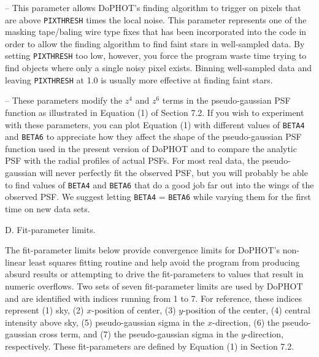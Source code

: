  -- This parameter allows DoPHOT's
finding algorithm to trigger on pixels that are above
{\tt PIXTHRESH} times the local noise.  This parameter
represents one of the masking tape/baling wire type fixes
that has been incorporated into the code in order to 
allow the finding algorithm to find faint stars in 
well-sampled data.  By setting {\tt PIXTHRESH} too low,
however, you force the program waste time trying to
find objects where only a single noisy pixel exists.  
Binning well-sampled data and leaving {\tt PIXTHRESH}
at 1.0 is usually more effective at finding faint stars.

 -- These parameters modify the
$z^4$ and $z^6$ terms in the pseudo-gaussian PSF function
as illustrated in Equation (1) of Section 7.2.  If you wish
to experiment with these parameters, you can  
plot Equation (1) with different values of
{\tt BETA4} and {\tt BETA6} to appreciate how they 
affect the shape of the pseudo-gaussian PSF function used
in the present version of DoPHOT and to compare the
analytic PSF with the radial profiles of actual PSFs.  For most
real data, the pseudo-gaussian will never perfectly fit
the observed PSF, but you will probably be able to find
values of {\tt BETA4} and {\tt BETA6} that do a good job
far out into the wings of the observed PSF.  We suggest letting
{\tt BETA4} = {\tt BETA6} while varying them for the first time
on new data sets.

\noindent D. Fit-parameter limits.  

The fit-parameter limits below provide convergence limits for
DoPHOT's non-linear least squares fitting routine and help avoid the 
program from producing absurd results or attempting to drive
the fit-parameters to values that result in numeric overflows.  Two sets of 
seven fit-parameter limits are used by DoPHOT and are identified
with indices running from 1 to 7.    For reference, these indices represent 
(1) sky, (2) $x$-position of center, (3) $y$-position of the center,
(4) central intensity above sky, (5) pseudo-gaussian sigma in the 
$x$-direction, (6) the pseudo-gaussian cross term, and (7) the pseudo-gaussian
sigma in the $y$-direction, respectively.  These fit-parameters
are defined by Equation (1) in Section 7.2.

